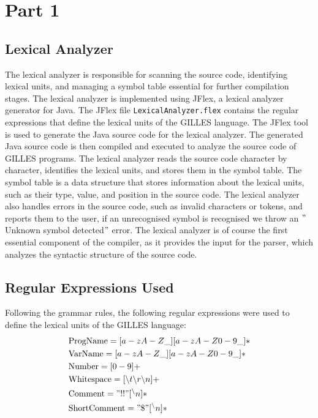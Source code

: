 \documentclass{article}
\begin{document}
	\section{Part 1}
	\subsection{Lexical Analyzer}
	The lexical analyzer is responsible for scanning the source code, identifying lexical units,
	and managing a symbol table essential for further compilation stages.
	The lexical analyzer is implemented using JFlex, a lexical analyzer generator for Java.
	The JFlex file \texttt{LexicalAnalyzer.flex} contains the regular expressions that define the lexical units of the GILLES language.
	The JFlex tool is used to generate the Java source code for the lexical analyzer.
	The generated Java source code is then compiled and executed to analyze the source code of GILLES programs.
	The lexical analyzer reads the source code character by character, identifies the lexical units, and stores them in the symbol table.
	The symbol table is a data structure that stores information about the lexical units, such as their type, value, and position in the source code.
	The lexical analyzer also handles errors in the source code, such as invalid characters or tokens, and reports them to the user, if an unrecognised symbol is recognised we throw an \("\)Unknown symbol detected\("\) error.
	The lexical analyzer is of course the first essential component of the compiler, as it provides the input for the parser, which analyzes the syntactic structure of the source code.\\

	\subsection{Regular Expressions Used}
	Following the grammar rules, the following regular expressions were used to define the lexical units of the GILLES language:
	\begin{align*}
		&\text{ProgName}     = [a-zA-Z\_][a-zA-Z0-9\_]* \\
		&\text{VarName}      = [a-zA-Z\_][a-zA-Z0-9\_]* \\
		&\text{Number}       = [0-9]+ \\
		&\text{Whitespace}   = [ \text{\textbackslash} t\text{\textbackslash} r\text{\textbackslash} n]+ \\
		&\text{Comment}      = "!!"[^\text{\textbackslash} n]* \\
		&\text{ShortComment} = "\$"[^\text{\textbackslash} n]*
	\end{align*}
\end{document}
